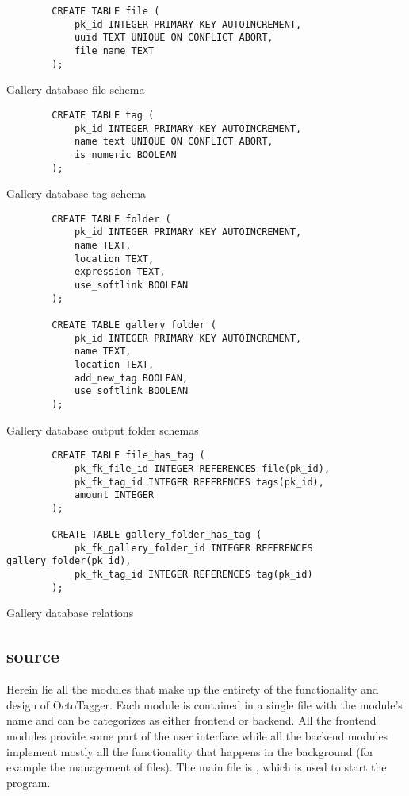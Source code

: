 \begin{listing}[p]
	\begin{verbatim}
		CREATE TABLE file (
			pk_id INTEGER PRIMARY KEY AUTOINCREMENT,
			uuid TEXT UNIQUE ON CONFLICT ABORT,
			file_name TEXT
		);
	\end{verbatim}
	\caption{Gallery database file schema}
	\label{lst:db:gallery:file}
\end{listing}

\begin{listing}[p]
	\begin{verbatim}
		CREATE TABLE tag (
			pk_id INTEGER PRIMARY KEY AUTOINCREMENT,
			name text UNIQUE ON CONFLICT ABORT,
			is_numeric BOOLEAN
		);
	\end{verbatim}
	\caption{Gallery database tag schema}
	\label{lst:db:gallery:tag}
\end{listing}

\begin{listing}[p]
	\begin{verbatim}
		CREATE TABLE folder (
			pk_id INTEGER PRIMARY KEY AUTOINCREMENT,
			name TEXT,
			location TEXT,
			expression TEXT,
			use_softlink BOOLEAN
		);

		CREATE TABLE gallery_folder (
			pk_id INTEGER PRIMARY KEY AUTOINCREMENT,
			name TEXT,
			location TEXT,
			add_new_tag BOOLEAN,
			use_softlink BOOLEAN
		);
	\end{verbatim}
	\caption{Gallery database output folder schemas}
	\label{lst:db:gallery:folder}
\end{listing}

\begin{listing}[p]
	\begin{verbatim}
		CREATE TABLE file_has_tag (
			pk_fk_file_id INTEGER REFERENCES file(pk_id),
			pk_fk_tag_id INTEGER REFERENCES tags(pk_id),
			amount INTEGER
		);

		CREATE TABLE gallery_folder_has_tag (
			pk_fk_gallery_folder_id INTEGER REFERENCES gallery_folder(pk_id),
			pk_fk_tag_id INTEGER REFERENCES tag(pk_id)
		);
	\end{verbatim}
	\caption{Gallery database relations}
	\label{lst:db:gallery:relations}
\end{listing}

\subsection{source}
Herein lie all the modules that make up the entirety of the functionality and
design of OctoTagger. Each module is contained in a single file with the
module's name and can be categorizes as either frontend or backend. All the
frontend modules provide some part of the user interface while all the backend
modules implement mostly all the functionality that happens in the background
(for example the management of files). The main file is , 
which is used to start the program.

